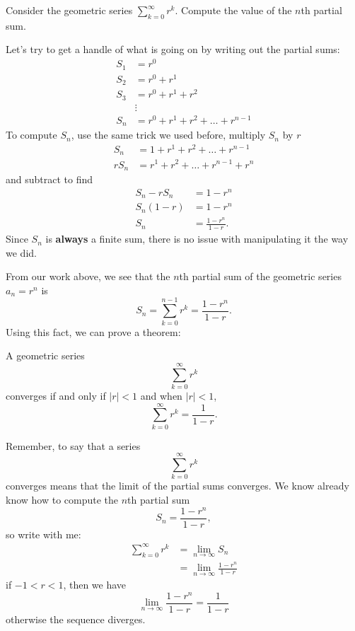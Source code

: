 \documentclass{ximera}
\begin{document}
\begin{example}
  Consider the geometric series $\sum_{k=0}^\infty r^k$. Compute the
  value of the $n$th partial sum.
  \begin{explanation}
    Let's try to get a handle of what is going on by writing out the partial sums:
    \begin{align*}
      S_1 &= r^0 \\
      S_2 &= r^0 + r^1\\
      S_3 &= r^0 + r^1 + r^2\\
      &\vdots\\
      S_n &= r^0 + r^1 + r^2 + \dots + r^{n-1}
    \end{align*}
    To compute $S_n$, use the same trick we used before, multiply $S_n$ by $r$
    \begin{align*}
      S_n   &= 1 + r^1 + r^2 + \dots + r^{n-1}\\
      r S_n &= r^1 + r^2 + \dots + r^{n-1} + r^n
    \end{align*}
    and subtract to find
    \begin{align*}
      S_n - r S_n &= 1 - r^n\\
      S_n(1-r)    &= 1 - r^n\\
      S_n &= \frac{1 - r^n}{1-r}.
    \end{align*}
    Since $S_n$ is \textbf{always} a finite sum, there is no issue
    with manipulating it the way we did.
  \end{explanation}
\end{example}

From our work above, we see that the $n$th partial sum of the
geometric series $a_n = r^n$ is
\[
S_n = \sum_{k=0}^{n-1} r^k= \frac{1 - r^n}{1-r}.
\]
Using this fact, we can prove a theorem:
\begin{theorem}
  A geometric series
  \[
  \sum_{k= 0}^\infty r^k
  \]
  converges if and only if $|r| < 1$ and when $|r|<1$, 
  \[
  \sum_{k=0}^\infty r^k = \frac{1}{1-r}.
  \]
  \begin{explanation}
    Remember, to say that a series
    \[
    \sum_{k= 0}^\infty r^k
    \]
    converges means that the limit of the partial sums converges. We
    know already know how to compute the $n$th partial sum
    \[
    S_n = \frac{1 - r^n}{1-r},
    \]
    so write with me:
    \begin{align*}
      \sum_{k= 0}^\infty r^k &= \lim_{n\to\infty}S_n \\
      &= \lim_{n\to\infty}\frac{1 - r^n}{1-r}
    \end{align*}
    if $-1<r<1$, then we have
    \[
    \lim_{n\to\infty}\frac{1 - r^n}{1-r} = \frac{1}{1-r}
    \]
    otherwise the sequence diverges.
  \end{explanation}
\end{theorem}
\end{document}
